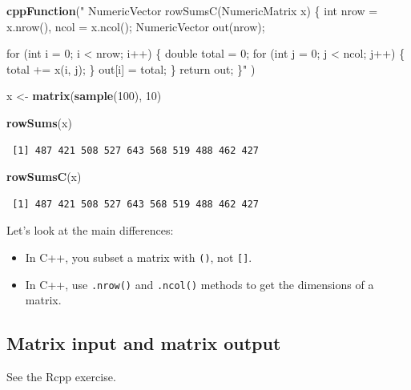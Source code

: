 \documentclass[]{krantz}
\makeatletter
\newenvironment{Shaded}{\begin{snugshade}}{\end{snugshade}}
\newcommand{\KeywordTok}[1]{\textcolor[rgb]{0.27,0.27,0.27}{\textbf{#1}}}
\newcommand{\DecValTok}[1]{\textcolor[rgb]{0.06,0.06,0.06}{#1}}
\newcommand{\StringTok}[1]{\textcolor[rgb]{0.5,0.5,0.5}{#1}}
\newcommand{\NormalTok}[1]{#1}
\providecommand{\tightlist}{%
  \setlength{\itemsep}{0pt}\setlength{\parskip}{0pt}}
\newenvironment{kframe}{%
\medskip{}
\setlength{\fboxsep}{.8em}
 \def\at@end@of@kframe{}%
 \ifinner\ifhmode%
  \def\at@end@of@kframe{\end{minipage}}%
  \begin{minipage}{\columnwidth}%
 \fi\fi%
 \def\FrameCommand##1{\hskip\@totalleftmargin \hskip-\fboxsep
 \colorbox{shadecolor}{##1}\hskip-\fboxsep
     \hskip-\linewidth \hskip-\@totalleftmargin \hskip\columnwidth}%
 \MakeFramed {\advance\hsize-\width
   \@totalleftmargin\z@ \linewidth\hsize
   \@setminipage}}%
 {\par\unskip\endMakeFramed%
 \at@end@of@kframe}
\renewenvironment{Shaded}{\begin{kframe}}{\end{kframe}}
\makeatother
\begin{document}
\begin{Shaded}
\begin{Highlighting}[]
\KeywordTok{cppFunction}\NormalTok{(}\StringTok{"}
\StringTok{  NumericVector rowSumsC(NumericMatrix x) \{}
\StringTok{    int nrow = x.nrow(), ncol = x.ncol();}
\StringTok{    NumericVector out(nrow);}

\StringTok{    for (int i = 0; i < nrow; i++) \{}
\StringTok{      double total = 0;}
\StringTok{      for (int j = 0; j < ncol; j++) \{}
\StringTok{        total += x(i, j);}
\StringTok{      \}}
\StringTok{      out[i] = total;}
\StringTok{    \}}
\StringTok{    return out;}
\StringTok{  \}"}
\NormalTok{)}

\NormalTok{x <-}\StringTok{ }\KeywordTok{matrix}\NormalTok{(}\KeywordTok{sample}\NormalTok{(}\DecValTok{100}\NormalTok{), }\DecValTok{10}\NormalTok{)}

\KeywordTok{rowSums}\NormalTok{(x)}
\end{Highlighting}
\end{Shaded}

\begin{verbatim}
 [1] 487 421 508 527 643 568 519 488 462 427
\end{verbatim}

\begin{Shaded}
\begin{Highlighting}[]
\KeywordTok{rowSumsC}\NormalTok{(x)}
\end{Highlighting}
\end{Shaded}

\begin{verbatim}
 [1] 487 421 508 527 643 568 519 488 462 427
\end{verbatim}

Let's look at the main differences:

\begin{itemize}
\tightlist
\item
  In C++, you subset a matrix with \texttt{()}, not \texttt{{[}{]}}.
\item
  In C++, use \texttt{.nrow()} and \texttt{.ncol()} methods to get the
  dimensions of a matrix.
\end{itemize}

\subsection{Matrix input and matrix
output}\label{matrix-input-and-matrix-output}

See the Rcpp exercise.
\end{document}
